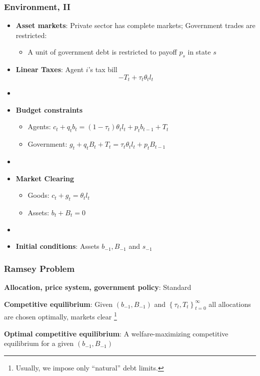 \documentclass{beamer}
\begin{document}
\begin{frame}
 \frametitle{Environment, II}
 \begin{itemize}
\item \textbf{Asset markets}: Private sector has complete markets; Government trades are restricted:
\begin{itemize}
	\item  A unit of government debt is restricted to payoff $p_s$ in state $s$
\end{itemize}
  \item \textbf{Linear Taxes}: Agent $i$'s tax bill
\[- T_t + \tau_t \theta_{t}l_{t}\]

\item[]
  \item \textbf{Budget constraints}
  \begin{itemize}
   \item Agents: $ c_{t}+q_tb_{t}=\left( 1-\tau _{t}\right) \theta _{t}l_{t}+p_{t}b_{t-1}+T_{t}$
  \item Government: $g_{t}+q_tB_{t}+T_t=\tau _{t}\theta_{t}l_{t}+p_{t}B_{t-1}$
  \end{itemize}

\item[]
  \item \textbf{Market Clearing}
  \begin{itemize}
   \item Goods: $c_{t}+g_t = \theta _{t} l_{t}$

   \item Assets: $b_{t}+B_{t}=0$
\end{itemize}
  \item[]

\item \textbf{Initial conditions}: Assets $b_{-1}, B_{-1}$ and  $s_{-1}$
\end{itemize}

\end{frame}


\begin{frame}
 \frametitle{Ramsey Problem}

\begin{definition}
\textbf{Allocation, price system, government policy}: Standard

\end{definition}

\begin{definition}
\textbf{Competitive equilibrium}: Given $\left(b_{-1},B_{-1}\right) $ and $\left\{ \tau _{t},T_{t}\right\} _{t=0}^{\infty }$
all allocations are chosen optimally, markets clear \footnote{Usually, we impose only  ``natural'' debt limits. }
\end{definition}

\begin{definition}
\textbf{Optimal competitive equilibrium}: A welfare-maximizing competitive
equilibrium for a given $\left( b_{-1},B_{-1}\right) $
\end{definition}

 \end{frame}
 
\end{document}
